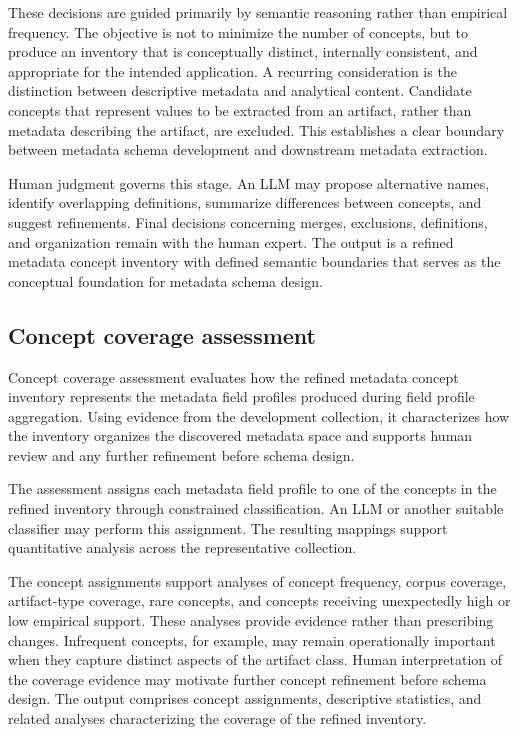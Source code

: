 \documentclass{article}
\begin{document}
These decisions are guided primarily by semantic reasoning rather than empirical frequency. The objective is not to minimize the number of concepts, but to produce an inventory that is conceptually distinct, internally consistent, and appropriate for the intended application. A recurring consideration is the distinction between descriptive metadata and analytical content. Candidate concepts that represent values to be extracted from an artifact, rather than metadata describing the artifact, are excluded. This establishes a clear boundary between metadata schema development and downstream metadata extraction.

Human judgment governs this stage. An LLM may propose alternative names, identify overlapping definitions, summarize differences between concepts, and suggest refinements. Final decisions concerning merges, exclusions, definitions, and organization remain with the human expert. The output is a refined metadata concept inventory with defined semantic boundaries that serves as the conceptual foundation for metadata schema design.

\subsection{Concept coverage assessment}

Concept coverage assessment evaluates how the refined metadata concept inventory represents the metadata field profiles produced during field profile aggregation. Using evidence from the development collection, it characterizes how the inventory organizes the discovered metadata space and supports human review and any further refinement before schema design.

The assessment assigns each metadata field profile to one of the concepts in the refined inventory through constrained classification. An LLM or another suitable classifier may perform this assignment. The resulting mappings support quantitative analysis across the representative collection.

The concept assignments support analyses of concept frequency, corpus coverage, artifact-type coverage, rare concepts, and concepts receiving unexpectedly high or low empirical support. These analyses provide evidence rather than prescribing changes. Infrequent concepts, for example, may remain operationally important when they capture distinct aspects of the artifact class. Human interpretation of the coverage evidence may motivate further concept refinement before schema design. The output comprises concept assignments, descriptive statistics, and related analyses characterizing the coverage of the refined inventory.
\end{document}
